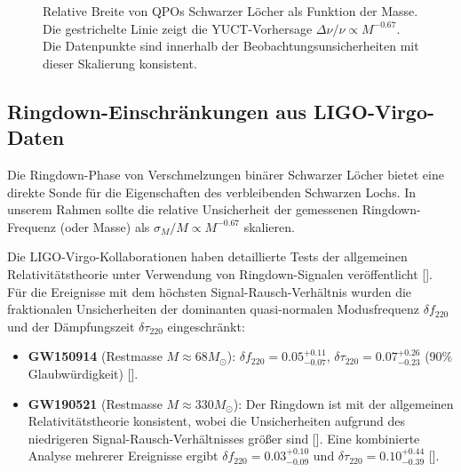 \documentclass[12pt,a4paper]{article}
\begin{document}
	\begin{figure}[htbp]
		\centering
		\caption{Relative Breite von QPOs Schwarzer Löcher als Funktion der Masse. Die gestrichelte Linie zeigt die YUCT-Vorhersage \(\Delta\nu/\nu \propto M^{-0.67}\). Die Datenpunkte sind innerhalb der Beobachtungsunsicherheiten mit dieser Skalierung konsistent.}
		\label{fig:qpo_scaling}
	\end{figure}
	
	\subsection{Ringdown-Einschränkungen aus LIGO-Virgo-Daten}
	
	Die Ringdown-Phase von Verschmelzungen binärer Schwarzer Löcher bietet eine direkte Sonde für die Eigenschaften des verbleibenden Schwarzen Lochs. In unserem Rahmen sollte die relative Unsicherheit der gemessenen Ringdown-Frequenz (oder Masse) als \(\sigma_M/M \propto M^{-0.67}\) skalieren.
	
	Die LIGO-Virgo-Kollaborationen haben detaillierte Tests der allgemeinen Relativitätstheorie unter Verwendung von Ringdown-Signalen veröffentlicht [\cite{LIGO2021, Ghosh2021}]. Für die Ereignisse mit dem höchsten Signal-Rausch-Verhältnis wurden die fraktionalen Unsicherheiten der dominanten quasi-normalen Modusfrequenz \(\delta f_{220}\) und der Dämpfungszeit \(\delta \tau_{220}\) eingeschränkt:
	
	\begin{itemize}
		\item \textbf{GW150914} (Restmasse \(M \approx 68 M_\odot\)): \(\delta f_{220} = 0.05^{+0.11}_{-0.07}\), \(\delta \tau_{220} = 0.07^{+0.26}_{-0.23}\) (90\% Glaubwürdigkeit) [\cite{Ghosh2021}].
		\item \textbf{GW190521} (Restmasse \(M \approx 330 M_\odot\)): Der Ringdown ist mit der allgemeinen Relativitätstheorie konsistent, wobei die Unsicherheiten aufgrund des niedrigeren Signal-Rausch-Verhältnisses größer sind [\cite{Abbott2020b}]. Eine kombinierte Analyse mehrerer Ereignisse ergibt \(\delta f_{220} = 0.03^{+0.10}_{-0.09}\) und \(\delta \tau_{220} = 0.10^{+0.44}_{-0.39}\) [\cite{Ghosh2021}].
	\end{itemize}
	
\end{document}
